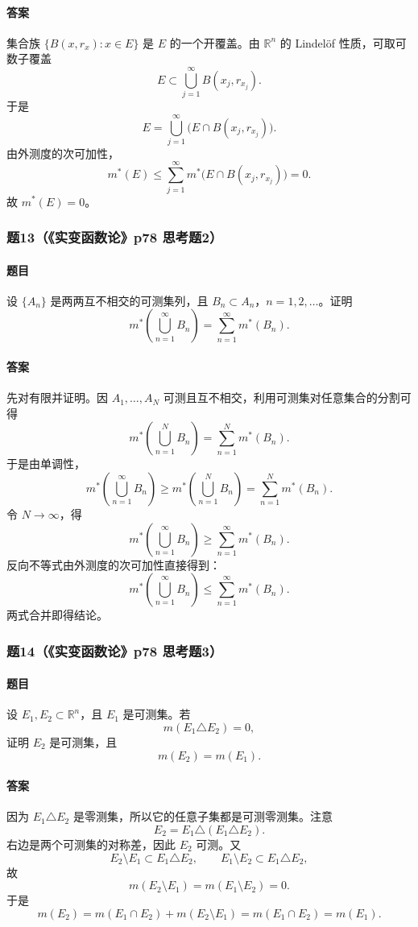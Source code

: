 \documentclass{article}
\newcommand{\R}{\mathbb{R}}
\newcommand{\meas}{m}
\newcommand{\mouter}{m^*}
\begin{document}
	\paragraph{答案}集合族 $\{B(x,r_x):x\in E\}$ 是 $E$ 的一个开覆盖。由 $\R^n$ 的 Lindelöf 性质，可取可数子覆盖
	\[
	E\subset\bigcup_{j=1}^{\infty}B(x_j,r_{x_j}).
	\]
	于是
	\[
	E=\bigcup_{j=1}^{\infty}\bigl(E\cap B(x_j,r_{x_j})\bigr).
	\]
	由外测度的次可加性，
	\[
	\mouter(E)
	\le\sum_{j=1}^{\infty}\mouter\bigl(E\cap B(x_j,r_{x_j})\bigr)=0.
	\]
	故 $\mouter(E)=0$。
	
	\subsubsection*{题13（《实变函数论》p78 思考题2）}
	\paragraph{题目}设 $\{A_n\}$ 是两两互不相交的可测集列，且 $B_n\subset A_n$，$n=1,2,\ldots$。证明
	\[
	\mouter\left(\bigcup_{n=1}^{\infty}B_n\right)=\sum_{n=1}^{\infty}\mouter(B_n).
	\]
	
	\paragraph{答案}先对有限并证明。因 $A_1,\ldots,A_N$ 可测且互不相交，利用可测集对任意集合的分割可得
	\[
	\mouter\left(\bigcup_{n=1}^{N}B_n\right)=\sum_{n=1}^{N}\mouter(B_n).
	\]
	于是由单调性，
	\[
	\mouter\left(\bigcup_{n=1}^{\infty}B_n\right)
	\ge
	\mouter\left(\bigcup_{n=1}^{N}B_n\right)
	=
	\sum_{n=1}^{N}\mouter(B_n).
	\]
	令 $N\to\infty$，得
	\[
	\mouter\left(\bigcup_{n=1}^{\infty}B_n\right)
	\ge
	\sum_{n=1}^{\infty}\mouter(B_n).
	\]
	反向不等式由外测度的次可加性直接得到：
	\[
	\mouter\left(\bigcup_{n=1}^{\infty}B_n\right)
	\le
	\sum_{n=1}^{\infty}\mouter(B_n).
	\]
	两式合并即得结论。
	
	\subsubsection*{题14（《实变函数论》p78 思考题3）}
	\paragraph{题目}设 $E_1,E_2\subset\R^n$，且 $E_1$ 是可测集。若
	\[
	\meas(E_1\triangle E_2)=0,
	\]
	证明 $E_2$ 是可测集，且
	\[
	\meas(E_2)=\meas(E_1).
	\]
	
	\paragraph{答案}因为 $E_1\triangle E_2$ 是零测集，所以它的任意子集都是可测零测集。注意
	\[
	E_2=E_1\triangle(E_1\triangle E_2).
	\]
	右边是两个可测集的对称差，因此 $E_2$ 可测。又
	\[
	E_2\setminus E_1\subset E_1\triangle E_2,
	\qquad
	E_1\setminus E_2\subset E_1\triangle E_2,
	\]
	故
	\[
	\meas(E_2\setminus E_1)=\meas(E_1\setminus E_2)=0.
	\]
	于是
	\[
	\meas(E_2)=\meas(E_1\cap E_2)+\meas(E_2\setminus E_1)
	=\meas(E_1\cap E_2)
	=\meas(E_1).
	\]
	
\end{document}
